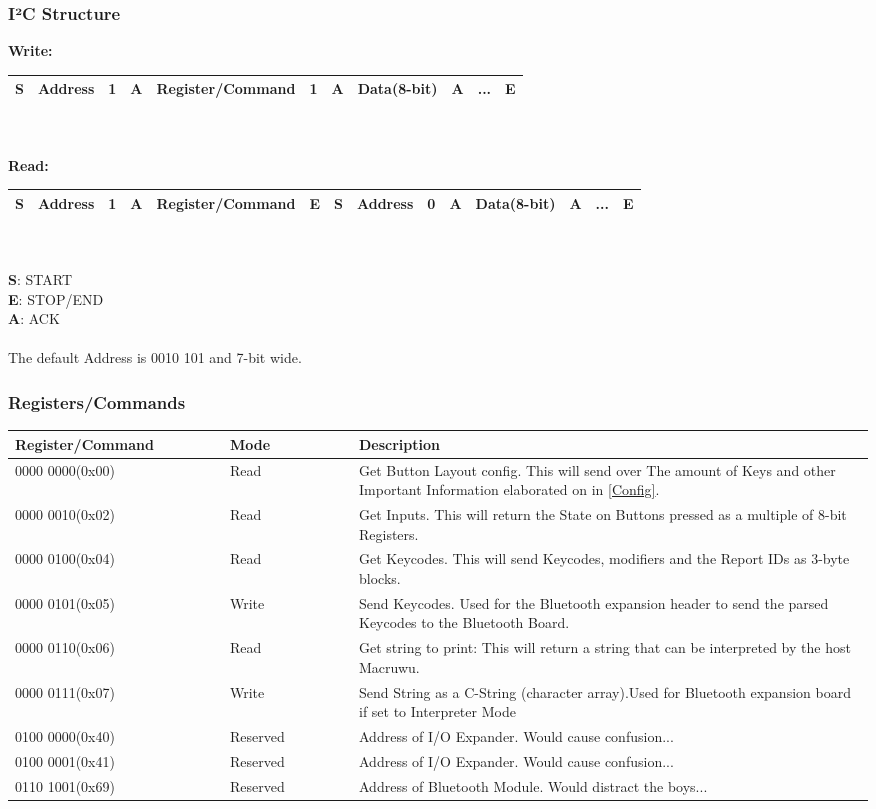 \documentclass[english, 12pt]{scrartcl}
\begin{document}
	\subsubsection{I²C Structure}
	\textbf{Write:}\\
	\begin{tabular}{|c|c|c|c|c|c|c|c|c|c|c|}
		\hline
		S&Address&1&A&Register/Command&1&A&Data(8-bit)&A&...&E\\
		\hline
	\end{tabular}
	\\\\
	\noindent\textbf{Read:}\\
	\begin{tabular}{|c|c|c|c|c|c|c|c|c|c|c|c|c|c|}
		\hline
		S&Address&1&A&Register/Command&E&S&Address&0&A&Data(8-bit)&A&...&E\\
		\hline
	\end{tabular}
	\\\\
	\textbf{S}: START\\
	\textbf{E}: STOP/END\\
	\textbf{A}: ACK\\
	\\
	\noindent The default Address is 0010 101 and 7-bit wide.
	\subsubsection{Registers/Commands}
	\begin{center}
		\begin{tabular}{|m{0.25\linewidth}|m{0.15\linewidth}|m{0.6\linewidth}|}
			\hline
			Register/Command&Mode&Description\\
			\hline
			0000 0000(0x00)&Read&Get Button Layout config. This will send over The amount of Keys and other Important Information elaborated on in \ref*{Config}.\\
			\hline
			0000 0010(0x02)&Read&Get Inputs. This will return the State on Buttons pressed as a multiple of 8-bit Registers.\\
			\hline
			0000 0100(0x04)&Read&Get Keycodes. This will send Keycodes, modifiers and the Report IDs as 3-byte blocks.\\
			\hline
			0000 0101(0x05)&Write&Send Keycodes. Used for the Bluetooth expansion header to send the parsed Keycodes to the Bluetooth Board.\\
			\hline
			0000 0110(0x06)&Read&Get string to print: This will return a string that can be interpreted by the host Macruwu.\\
			\hline
			0000 0111(0x07)&Write&Send String as a C-String (character array).Used for Bluetooth expansion board if set to Interpreter Mode\\
			\hline
			0100 0000(0x40)&Reserved&Address of I/O Expander. Would cause confusion...\\
			\hline
			0100 0001(0x41)&Reserved&Address of I/O Expander. Would cause confusion...\\
			\hline
			0110 1001(0x69)&Reserved&Address of Bluetooth Module. Would distract the boys...\\
			\hline
		\end{tabular}
	\end{center}
\end{document}
